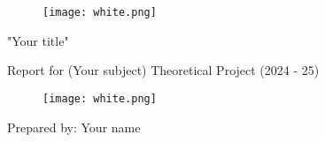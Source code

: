 \begin{titlepage}
	\begin{figure}[hp]
		\texttt{[image: white.png]}
	\end{figure}
	\begin{center}
		\Huge{"Your title"}
	\end{center}
	\begin{center}
		\Large{Report for (Your subject) Theoretical Project (2024 - 25)}
	\end{center}
	\begin{figure}[hp]
		\texttt{[image: white.png]}
	\end{figure}
	\Large{Prepared by: Your name}
\end{titlepage}
